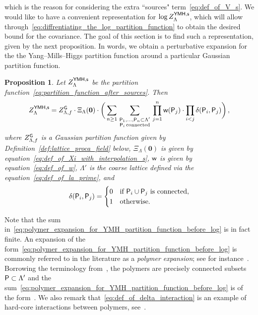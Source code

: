 \documentclass[11pt]{article}
\newtheorem{proposition}[theorem]{Proposition}
\theoremstyle{definition}
\theoremstyle{remark}
\numberwithin{theorem}{section}
\def\La{{\Lambda}}
\begin{document}
    which is the reason for considering the extra ``sources" term~\eqref{eq:def_of_V_s}. We would like to have a convenient representation for $\log Z_{\Lambda}^{\sf YMH,s}$, which will allow through~\eqref{eq:diffrentiating_the_log_partition_function} to obtain the desired bound for the covariance. The goal of this section is to find such a representation, given by the next proposition. In words, we obtain a perturbative expansion for the the Yang--Mills--Higgs partition function around a particular Gaussian partition function.
    \begin{proposition}
    \label{proposition:expansion_for_YMH_partition_function_before_log}
        Let $Z_{\Lambda}^{{\sf YMH,s}}$ be the partition function~\eqref{eq:partition_function_after_sources}. Then
        \begin{equation}
        \label{eq:polymer_expansion_for_YMH_partition_function_before_log}
            Z_{\Lambda}^{{\sf YMH,s}} = Z_{\Lambda,f}^{{\sf G}}\cdot \Xi_{\Lambda}(\mathbf{0})\cdot \bigg( \sum_{n\ge 1} \, \sum_{\substack{{\sf P}_1,\ldots, {\sf P}_n\subset \La^\prime \\ {\sf P}_i \, \text{\normalfont connected}}} \,  \prod_{j=1}^{n} {\sf w}({\sf P}_{j})  \cdot \prod_{i<j} \delta({\sf P}_i,{\sf P}_j)  \bigg)\, ,
        \end{equation}
        where $Z_{\Lambda,f}^{\sf G}$ is a Gaussian partition function given by Definition~\ref{def:lattice_proca_field} below, $\Xi_{\Lambda}(\mathbf{0})$ is given by equation~\eqref{eq:def_of_Xi_with_interpolation_s},  ${\sf w}$ is given by equation~\eqref{eq:def_of_w}, $\Lambda'$ is the coarse lattice defined via the equation~\eqref{eq:def_of_la_prime}, and
        \begin{equation}
        \label{eq:def_of_delta_interaction}
        \delta({\sf P}_i,{\sf P}_j) = \begin{cases}
            0 & \text{\normalfont if ${\sf P}_i\cup {\sf P}_j$ is connected}, \\ 1 & \text{\normalfont otherwise.} 
        \end{cases}    
        \end{equation}
    \end{proposition}
    \noindent
    Note that the sum in~\eqref{eq:polymer_expansion_for_YMH_partition_function_before_log} is in fact finite. An expansion of the form~\eqref{eq:polymer_expansion_for_YMH_partition_function_before_log} is commonly referred to in the literature as a \emph{polymer expansion}; see for instance~\cite[Chapter~5]{Friedli-Velenik_book}. Borrowing the terminology from~\cite{Friedli-Velenik_book}, the polymers are precisely connected subsets ${\sf P}\subset \La^\prime $ and the sum~\eqref{eq:polymer_expansion_for_YMH_partition_function_before_log} is of the form~\cite[Definition~5.2]{Friedli-Velenik_book}. We also remark that~\eqref{eq:def_of_delta_interaction} is an example of hard-core interactions between polymers, see~\cite[Section~5.6]{Friedli-Velenik_book}. 
\end{document}
